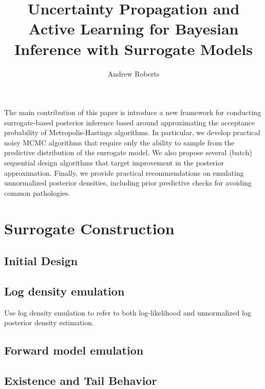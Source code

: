 \documentclass[12pt]{article}
\title{Uncertainty Propagation and Active Learning for Bayesian Inference with Surrogate Models}
\author{Andrew Roberts}
\begin{document}
\maketitle

The main contribution of this paper is introduce a new framework for conducting surrogate-based
posterior inference based around approximating the acceptance probability of Metropolis-Hastings
algorithms. In particular, we develop practical noisy MCMC algorithms that require only the ability
to sample from the predictive distribution of the surrogate model. We also propose several (batch) 
sequential design algorithms that target improvement in the posterior approximation. 
Finally, we provide practical recommendations on emulating unnormalized posterior densities, 
including prior predictive checks for avoiding common pathologies. 

\section{Surrogate Construction}
\subsection{Initial Design}
\subsection{Log density emulation}
Use log density emulation to refer to both log-likelihood and unnormalized log posterior density estimation.
\subsection{Forward model emulation}
\subsection{Existence and Tail Behavior}

\end{document}
